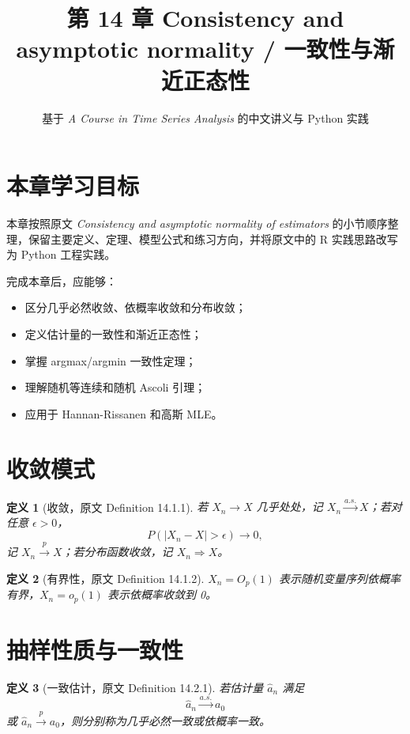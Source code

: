 \documentclass[11pt,a4paper]{ctexart}
\title{第 14 章 \quad Consistency and asymptotic normality / 一致性与渐近正态性}
\author{基于 \textit{A Course in Time Series Analysis} 的中文讲义与 Python 实践}
\date{}
\newtheorem{definition}{定义}[section]
\begin{document}
\maketitle

\section*{本章学习目标}

本章按照原文 \textit{Consistency and asymptotic normality of estimators} 的小节顺序整理，保留主要定义、定理、模型公式和练习方向，并将原文中的 R 实践思路改写为 Python 工程实践。

完成本章后，应能够：
\begin{itemize}
  \item 区分几乎必然收敛、依概率收敛和分布收敛；
  \item 定义估计量的一致性和渐近正态性；
  \item 掌握 argmax/argmin 一致性定理；
  \item 理解随机等连续和随机 Ascoli 引理；
  \item 应用于 Hannan-Rissanen 和高斯 MLE。
\end{itemize}

\section{收敛模式}

\begin{definition}[收敛，原文 Definition 14.1.1]
若 \(X_n\to X\) 几乎处处，记 \(X_n\xrightarrow{a.s.}X\)；若对任意 \(\epsilon>0\)，
\[
  P(|X_n-X|>\epsilon)\to0,
\]
记 \(X_n\xrightarrow{p}X\)；若分布函数收敛，记 \(X_n\Rightarrow X\)。
\end{definition}

\begin{definition}[有界性，原文 Definition 14.1.2]
\(X_n=O_p(1)\) 表示随机变量序列依概率有界，\(X_n=o_p(1)\) 表示依概率收敛到 0。
\end{definition}

\section{抽样性质与一致性}

\begin{definition}[一致估计，原文 Definition 14.2.1]
若估计量 \(\hat a_n\) 满足
\[
  \hat a_n\xrightarrow{a.s.}a_0
\]
或 \(\hat a_n\xrightarrow{p}a_0\)，则分别称为几乎必然一致或依概率一致。
\end{definition}
\end{document}
